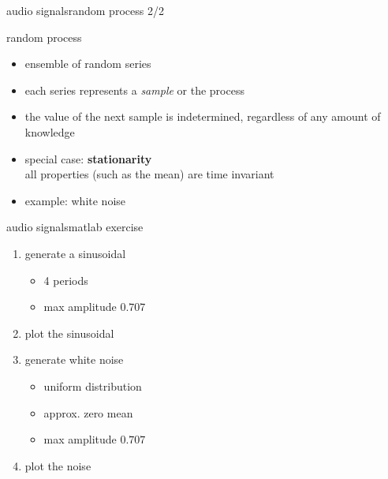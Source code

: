         \begin{frame}{audio signals}{random process 2/2}
            \toremember{}
            
            \begin{block}{random process}
                \begin{itemize}
                    \item   ensemble of random series
                    \item   each series represents a \textit{sample} or the process
                    \item   the value of the next sample is indetermined, regardless of any amount of knowledge
                \end{itemize}
            \end{block}
            \begin{itemize}
                \item   special case: \textbf{stationarity}\\ all properties (such as the mean) are time invariant
                \item   example: white noise
            \end{itemize}
        \end{frame}

        \begin{frame}{audio signals}{matlab exercise}
            
            \begin{enumerate}
                \item   generate a sinusoidal
                    \begin{itemize}
                        \item   4 periods
                        \item   max amplitude $0.707$
                    \end{itemize}
                \item   plot the sinusoidal
                \item   generate white noise 
                    \begin{itemize}
                        \item   uniform distribution
                        \item   approx. zero mean
                        \item   max amplitude $0.707$
                    \end{itemize}
                \item   plot the noise
            \end{enumerate}
        \end{frame}
            
